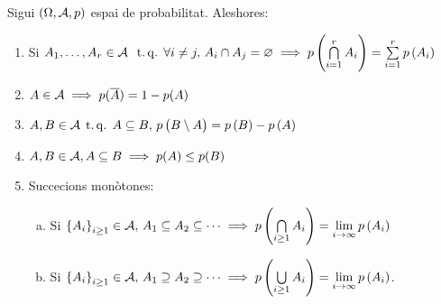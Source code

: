 \begin{prop}
    Sigui $(\Omega,\mathcal{A}, p)$ espai de probabilitat. Aleshores:
    \begin{enumerate}
	\item Si $A_1, \dots, A_r \in \mathcal{A}\; \operatorname{\;t.q.\;} \forall i\neq j,\, A_i \cap A_j = \varnothing \implies 
        p\left( \bigcap\limits_{i=1}^{r} A_i \right)= \sum\limits_{i=1}^{r} p\left( A_i \right) $
        \item \label{item:esp_prob_2}$A \in \mathcal{A} \implies p(\overline{A})=1-p(A)$
        \item \label{item:esp_prob_3}$A,B\in \mathcal{A} \operatorname{\;t.q.\;} A\subseteq B,\, p\left( B\setminus A \right) = p\left( B\right) - p\left( A\right)$
        \item $A,B \in \mathcal{A}, A \subseteq B \implies p(A) \le p(B)$
        \item Succecions monòtones:
        \begin{enumerate}[a)]
         \item Si $\left\{A_i\right\}_{i\geq 1} \in \mathcal{A},\, A_1\subseteq A_2 \subseteq \dots \implies 
         p\left( \bigcap\limits_{i\geq 1} A_i\right) = \lim\limits_{i\to\infty} p\left( A_i\right)$
         \item Si $\left\{A_i\right\}_{i\geq 1} \in \mathcal{A},\, A_1\supseteq A_2 \supseteq \dots \implies 
         p\left( \bigcup\limits_{i\geq 1} A_i\right) = \lim\limits_{i\to\infty} p\left( A_i\right)$.
        \end{enumerate}
    \end{enumerate}
\end{prop}
